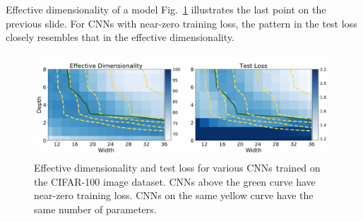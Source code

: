 \documentclass{beamer}
\begin{document}
\begin{frame}{Effective dimensionality of a model}
    Fig.~\ref{fig:effective_dimensionality_and_test_loss} illustrates the last point on the previous slide. For CNNs with near-zero training loss, the pattern in the test loss closely resembles that in the effective dimensionality.
    \begin{figure}
        \centering
        \includegraphics[width=\textwidth]{effective_dimensionality_and_test_loss}
        \caption{Effective dimensionality and test loss for various CNNs trained on the CIFAR-100 image dataset. CNNs above the green curve have near-zero training loss. CNNs on the same yellow curve have the same number of parameters.}
        \label{fig:effective_dimensionality_and_test_loss}
    \end{figure}    
\end{frame}
\end{document}
